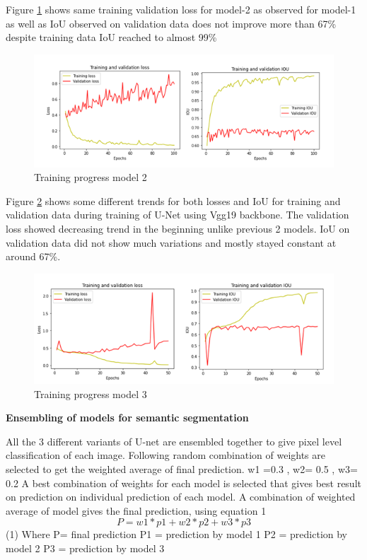 \documentclass[rnd]{mas_proposal}
\begin{document}
Figure \ref{fig:Training progress model 2} shows same training validation loss for model-2 as observed for model-1 as well as IoU observed on validation data does not improve more 
than 67\% despite training data IoU reached to almost 99\%

\begin{figure}[htp] 
        \centering
        \includegraphics[width=1.2\textwidth]{images/fig10.png}
        \caption{Training progress model 2}%
        \label{fig:Training progress model 2}%
\end{figure}


Figure \ref{fig:Training progress model 3} shows some different trends for both losses and IoU for training and validation data during training of U-Net using Vgg19 backbone.
 The validation loss showed decreasing trend in the beginning unlike previous 2 models. IoU on validation data did not show much variations and mostly 
 stayed constant at around 67\%.  
 \begin{figure}[htp] 
        \centering
        \includegraphics[width=1.2\textwidth]{images/fig11.png}
        \caption{Training progress model 3}%
        \label{fig:Training progress model 3}%
\end{figure}

\textbf{Ensembling of models for semantic segmentation}
\vspace{10px}

All the 3 different variants of U-net are ensembled together to give pixel level classification of each image. 
Following random combination of weights are selected to get the weighted average of final prediction.  
w1 =0.3 ,  w2= 0.5 ,  w3= 0.2
A best combination of weights for each model is selected that gives best result on prediction on individual prediction of each model. 
A combination of weighted average of model gives the final prediction, using equation 1
                    $$P=  w1*p1 + w2*p2 + w3*p3   $$                                                                   (1)
Where
P= final prediction 
P1 = prediction by model 1 
P2 = prediction by model 2
P3 = prediction by model 3
\end{document}
